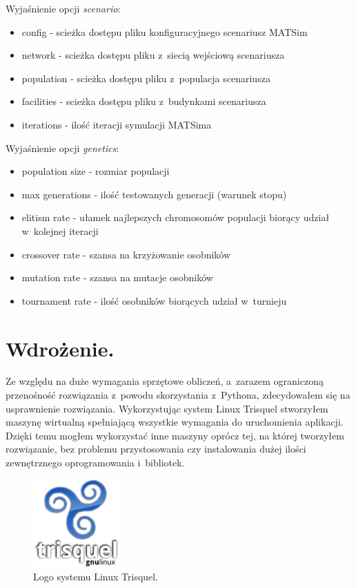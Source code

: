 \documentclass[twoside,12pt]{report}
\begin{document}
\vspace*{15px}

Wyjaśnienie opcji \textit{scenario}:
\begin{itemize}
\item config - scieżka dostępu pliku konfiguracyjnego scenariusz MATSim
\item network - scieżka dostępu pliku z~siecią wejściową scenariusza
\item population - scieżka dostępu pliku z~populacja scenariusza
\item facilities - scieżka dostępu pliku z~budynkami scenariusza
\item iterations - ilość iteracji symulacji MATSima
\end{itemize}

\vspace*{15px}

Wyjaśnienie opcji \textit{genetics}:
\begin{itemize}
\item population size - rozmiar populacji
\item max generations - ilość testowanych generacji (warunek stopu)
\item elitism rate - ułamek najlepszych chromosomów populacji biorący udział w~kolejnej iteracji
\item crossover rate - szansa na krzyżowanie osobników
\item mutation rate - szansa na mutacje osobników
\item tournament rate - ilość osobników biorących udział w~turnieju
\end{itemize}


\section{Wdrożenie.}

Ze względu na duże wymagania sprzętowe obliczeń, a~zarazem ograniczoną przenośność rozwiązania z~powodu skorzystania z~Pythona, zdecydowałem się na usprawnienie rozwiązania. Wykorzystując system Linux Trisquel stworzyłem maszynę wirtualną spełniającą wszystkie wymagania do uruchomienia aplikacji. Dzięki temu mogłem wykorzystać inne maszyny oprócz tej, na której tworzyłem rozwiązanie, bez problemu przystosowania czy instalowania dużej ilości zewnętrznego oprogramowania i~bibliotek\cite{trisquel}.

\begin{figure}[ht]
\centering
\includegraphics[width=0.3\textwidth]{img/trisquel}
\caption{Logo systemu Linux Trisquel.}
\end{figure}
\end{document}
